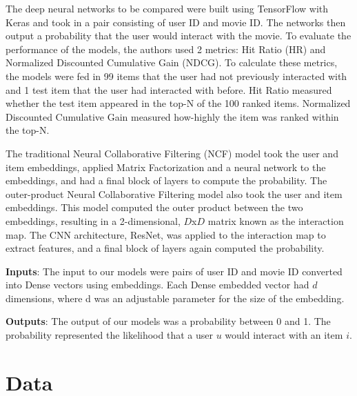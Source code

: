 \documentclass{article}
\begin{document}
The deep neural networks to be compared were built using TensorFlow with Keras and took in a pair consisting of user ID and movie ID. The networks then output a probability that the user would interact with the movie. To evaluate the performance of the models, the authors used 2 metrics: Hit Ratio (HR) and Normalized Discounted Cumulative Gain (NDCG). To calculate these metrics, the models were fed in 99 items that the user had not previously interacted with and 1 test item that the user had interacted with before. Hit Ratio measured whether the test item appeared in the top-N of the 100 ranked items. Normalized Discounted Cumulative Gain measured how-highly the item was ranked within the top-N.

The traditional Neural Collaborative Filtering (NCF) model took the user and item embeddings, applied Matrix Factorization and a neural network to the embeddings, and had a final block of layers to compute the probability. The outer-product Neural Collaborative Filtering model also took the user and item embeddings. This model computed the outer product between the two embeddings, resulting in a 2-dimensional, $D$x$D$ matrix known as the interaction map. The CNN architecture, ResNet, was applied to the interaction map to extract features, and a final block of layers again computed the probability.

\textbf{Inputs}: The input to our models were pairs of user ID and movie ID converted into Dense vectors using embeddings. Each Dense embedded vector had $d$ dimensions, where d was an adjustable parameter for the size of the embedding.

\textbf{Outputs}: The output of our models was a probability between 0 and 1. The probability represented the likelihood that a user $u$ would interact with an item $i$.

\section{Data}
\label{sec:Data}
\end{document}
